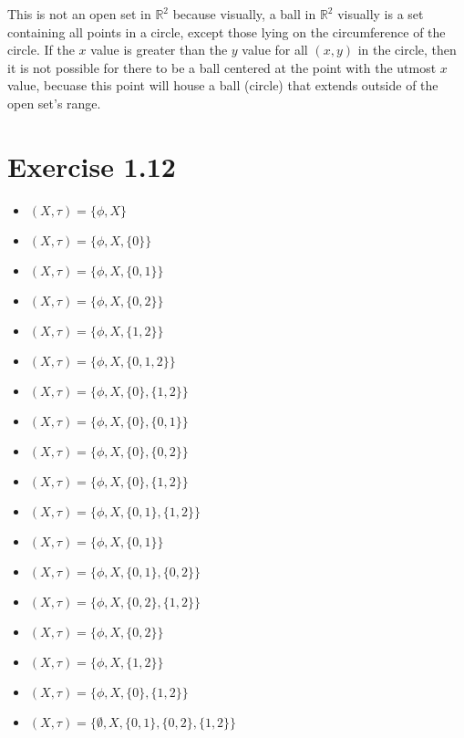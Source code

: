 \documentclass{report}
\begin{document}
\medskip

\sol This is not an open set in $\mathbb{R}^2$ because visually, a ball in $\mathbb{R}^2$ visually is a set containing all points in a circle, except those lying on the circumference of the circle. If the $x$ value is greater than the $y$ value for all $(x, y)$ in the circle, then it is not possible for there to be a ball centered at the point with the utmost $x$ value, becuase this point will house a ball (circle) that extends outside of the open set's range. 
\medskip

\section{Exercise 1.12}

\medskip

\sol
\begin{itemize}
  \item $(X, \tau) = \{\phi, X\}$
  \item $(X, \tau) = \{\phi, X, \{0\}\}$
  \item $(X, \tau) = \{\phi, X, \{0, 1\}\}$
  \item $(X, \tau) = \{\phi, X, \{0, 2\}\}$
  \item $(X, \tau) = \{\phi, X, \{1, 2\}\}$
  \item $(X, \tau) = \{\phi, X, \{0, 1, 2\}\}$
  \item $(X, \tau) = \{\phi, X, \{0\}, \{1, 2\}\}$
  \item $(X, \tau) = \{\phi, X, \{0\}, \{0, 1\}\}$
  \item $(X, \tau) = \{\phi, X, \{0\}, \{0, 2\}\}$
  \item $(X, \tau) = \{\phi, X, \{0\}, \{1, 2\}\}$
  \item $(X, \tau) = \{\phi, X, \{0, 1\}, \{1, 2\}\}$
  \item $(X, \tau) = \{\phi, X, \{0, 1\}\}$
  \item $(X, \tau) = \{\phi, X, \{0, 1\}, \{0, 2\}\}$
  \item $(X, \tau) = \{\phi, X, \{0, 2\}, \{1, 2\}\}$
  \item $(X, \tau) = \{\phi, X, \{0, 2\}\}$
  \item $(X, \tau) = \{\phi, X, \{1, 2\}\}$
  \item $(X, \tau) = \{\phi, X, \{0\}, \{1, 2\}\}$
  \item $(X, \tau) = \{\emptyset, X, \{0, 1\}, \{0, 2\}, \{1, 2\}\}$
\end{itemize}
\end{document}
